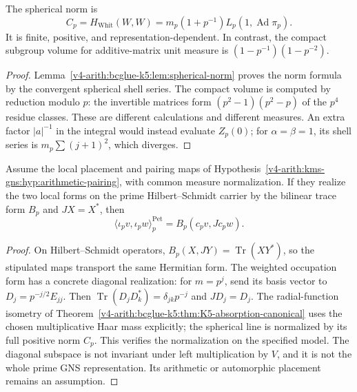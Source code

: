\begin{lemma}
\label{v4-arith:kp:lem:Pet-p-is-Plancherel}
The spherical norm is
\begin{equation}
\label{v4-arith:kp:eq:local-Plancherel}
 C_p=H_{\mathrm{Whit}}(W,W)
 =m_p(1+p^{-1})L_p(1,\operatorname{Ad}\pi_p).
\end{equation}
It is finite, positive, and representation-dependent. In contrast,
the compact subgroup volume for additive-matrix unit measure is
\((1-p^{-1})(1-p^{-2})\).
\end{lemma}
\begin{proof}
Lemma~\ref{v4-arith:bcglue-k5:lem:spherical-norm} proves the norm
formula by the convergent spherical shell series. The compact volume
is computed by reduction modulo \(p\): the invertible matrices form
\((p^2-1)(p^2-p)\) of the \(p^4\) residue classes. These are different
calculations and different measures. An extra factor \(|a|^{-1}\)
in the integral would instead evaluate \(Z_p(0)\); for
\(\alpha=\beta=1\), its shell series is \(m_p\sum(j+1)^2\),
which diverges.
\end{proof}

\begin{proposition}
\label{v4-arith:kp:prop:Pet-p-is-BC-sigma}
Assume the local placement and pairing maps of
Hypothesis~\ref{v4-arith:kms-gns:hyp:arithmetic-pairing}, with common
measure normalization. If they realize the two local forms on the
prime Hilbert--Schmidt carrier by the bilinear trace form \(B_p\)
and \(JX=X^*\), then
\begin{equation}
\label{v4-arith:kp:eq:Pet-p-match}
 \langle\iota_pv,\iota_pw\rangle^{\mathrm{Pet}}_p
 =B_p(c_pv,Jc_pw).
\end{equation}
\end{proposition}
\begin{proof}
On Hilbert--Schmidt operators,
\(B_p(X,JY)=\operatorname{Tr}(XY^*)\), so the stipulated maps
transport the same Hermitian form. The weighted occupation form
has a concrete diagonal realization: for \(m=p^j\), send its
basis vector to \(D_j=p^{-j/2}E_{jj}\). Then
\(\operatorname{Tr}(D_jD_k^*)=\delta_{jk}p^{-j}\) and \(JD_j=D_j\).
The radial-function isometry of
Theorem~\ref{v4-arith:bcglue-k5:thm:K5-absorption-canonical}
uses the chosen multiplicative Haar mass explicitly; the spherical
line is normalized by its full positive norm \(C_p\).
This verifies the normalization on the specified model. The
diagonal subspace is not invariant under left multiplication by
\(V\), and it is not the whole prime GNS representation. Its
arithmetic or automorphic placement remains an assumption.
\end{proof}

